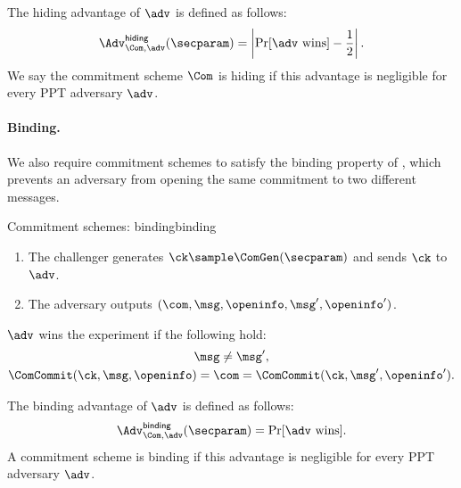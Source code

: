 The hiding advantage of $\adv$ is defined as follows:
%
\begin{equation*}
%
  \Adv_{\Com,\adv}^{\mathsf{hiding}}(\secparam) = \left| \Pr[\adv\text{
wins}]-\frac{1}{2} \right|.
%
\end{equation*}
%
We say the commitment scheme $\Com$ is hiding if this advantage is negligible for
every PPT adversary $\adv$.

\paragraph{Binding.} We also require commitment schemes to satisfy the binding
property of , which prevents an adversary from opening the same
commitment to two different messages.

\begin{experimentbox}{Commitment schemes: binding}{binding}

  \begin{enumerate}

    \item The challenger generates $\ck \sample \ComGen(\secparam)$ and sends
$\ck$ to $\adv$.

    \item The adversary outputs $(\com, \msg, \openinfo, \msg', \openinfo')$.

  \end{enumerate}

  $\adv$ wins the experiment if the following hold:
  \begin{gather*}
    \msg \neq \msg', \\
    \ComCommit(\ck, \msg, \openinfo) = \com = \ComCommit(\ck, \msg', \openinfo').
  \end{gather*}

\end{experimentbox}

The binding advantage of $\adv$ is defined as follows:
%
\begin{equation*}
%
  \Adv^{\mathsf{binding}}_{\Com,\adv}(\secparam) = \Pr[\adv\text{ wins}].
%
\end{equation*}
%
A commitment scheme is binding if this advantage is negligible for every PPT
adversary $\adv$.

